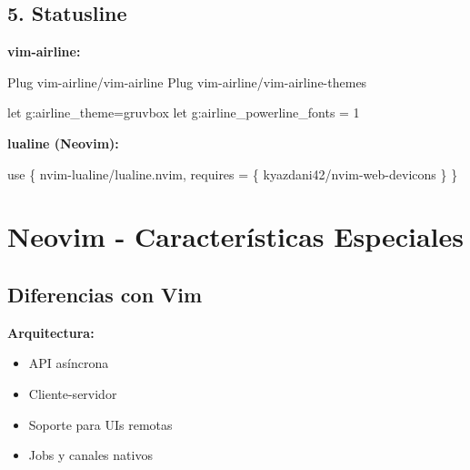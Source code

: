 \documentclass[
  doc,
  floatsintext,
  longtable,
  a4paper,
  nolmodern,
  notxfonts,
  notimes,
  12pt,
  colorlinks=true,linkcolor=blue,citecolor=blue,urlcolor=blue]{apa7}
\newenvironment{Shaded}{\begin{snugshade}}{\end{snugshade}}
\newcommand{\NormalTok}[1]{\textcolor[rgb]{0.00,0.23,0.31}{#1}}
\newcommand{\OperatorTok}[1]{\textcolor[rgb]{0.37,0.37,0.37}{#1}}
\newcommand{\StringTok}[1]{\textcolor[rgb]{0.13,0.47,0.30}{#1}}
\newcommand{\VariableTok}[1]{\textcolor[rgb]{0.07,0.07,0.07}{#1}}
\providecommand{\tightlist}{%
  \setlength{\itemsep}{0pt}\setlength{\parskip}{0pt}}
\begin{document}
\subsection{5. Statusline}\label{statusline}

\textbf{vim-airline:}

\begin{Shaded}
\begin{Highlighting}[]
\NormalTok{Plug \textquotesingle{}vim{-}airline/vim{-}airline\textquotesingle{}}
\NormalTok{Plug \textquotesingle{}vim{-}airline/vim{-}airline{-}themes\textquotesingle{}}

\NormalTok{let g:airline\_theme=\textquotesingle{}gruvbox\textquotesingle{}}
\NormalTok{let g:airline\_powerline\_fonts = 1}
\end{Highlighting}
\end{Shaded}

\textbf{lualine (Neovim):}

\begin{Shaded}
\begin{Highlighting}[]
\NormalTok{use }\OperatorTok{\{}
    \StringTok{\textquotesingle{}nvim{-}lualine/lualine.nvim\textquotesingle{}}\OperatorTok{,}
    \VariableTok{requires} \OperatorTok{=} \OperatorTok{\{} \StringTok{\textquotesingle{}kyazdani42/nvim{-}web{-}devicons\textquotesingle{}} \OperatorTok{\}}
\OperatorTok{\}}
\end{Highlighting}
\end{Shaded}

\section{Neovim - Características
Especiales}\label{neovim---caracteruxedsticas-especiales}

\subsection{Diferencias con Vim}\label{diferencias-con-vim}

\textbf{Arquitectura:}

\begin{itemize}
\tightlist
\item
  API asíncrona
\item
  Cliente-servidor
\item
  Soporte para UIs remotas
\item
  Jobs y canales nativos
\end{itemize}
\end{document}
